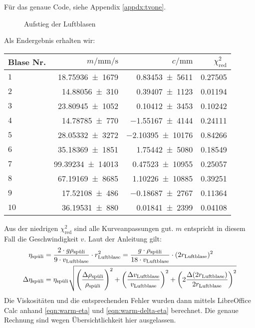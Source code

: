 		Für das genaue \gnuplot{} Code, siehe Appendix \ref{appdx:tvone}. 
		\begin{figure}[H]
			\centering
			\captionsetup{width=0.8\textwidth, justification=centering}
			\resizebox{\linewidth}{!}{}
			\caption{Aufstieg der Luftblasen }
			\vspace{-1em}
		\end{figure}
		Als Endergebnis erhalten wir:
		\begin{center}
			\begin{tabular}{lrrr}
				\toprule
				Blase Nr. & $m/\si{\milli\meter\per\second}$ & $c/\si{\milli\meter}$ & $\chi^2_\text{red}$ \\
				\midrule
					$1$ &  \num{18,75936(1679)} & \num{0,83453(5611)} & \num{0,27505} \\
					$2$ &  \num{14,88056(310)} & \num{0,39407(1123)} & \num{0,01194} \\
					$3$ &  \num{23,80945(1052)} & \num{0,10412(3453)} & \num{0,10242} \\
					$4$ &  \num{14,78785(770)} & \num{-1,55167(4144)} & \num{0,24111} \\
					$5$ &  \num{28,05332(3272)} & \num{-2,10395(10176)} & \num{0,84266} \\
					$6$ &  \num{35,18369(1851)} & \num{1,75442(5080)} & \num{0,18549} \\
					$7$ &  \num{99,39234(14013)} & \num{0,47523(10955)} & \num{0,25057} \\
					$8$ &  \num{67,19169(8685)} & \num{1,10226(10885)} & \num{0,39251} \\
					$9$ &  \num{17,52108(486)} & \num{-0,18687(2767)} & \num{0,11364} \\
					$10$ & \num{36,19531(880)} & \num{0,01841(2399)} & \num{0,04108} \\
				\bottomrule
			\end{tabular}
		\end{center}
		Aus der niedrigen $\chi^2_\text{red}$ sind alle Kurveanpassungen gut. $m$ entspricht in diesem Fall die Geschwindigkeit $v$.
		Laut der Anleitung gilt:
		\begin{align}
			\eta_\spuli &= \frac{2\cdot g\rho_\spuli}{9\cdot v_\text{Luftblase}}\cdot r^2_\text{Luftblase} = \frac{g\cdot \rho_\spuli}{18\cdot v_\text{Luftblase}}\cdot (2r_\text{Luftblase})^2 \label{eqn:warm-eta} \\
			\Delta \eta_\spuli &= \eta_\spuli \sqrt{
				\left(\frac{\Delta \rho_\spuli}{\rho_\spuli}\right)^2 +
				\left(\frac{\Delta v_\text{Luftblase}}{v_\text{Luftblase}}\right)^2 +
				\left(2\frac{\Delta (2r_\text{Luftblase})}{2r_\text{Luftblase}}\right)^2
			} \label{eqn:warm-delta-eta}
		\end{align}
		Die Viskositäten und die entsprechenden Fehler wurden dann mittels LibreOffice Calc anhand \eqref{eqn:warm-eta} und \eqref{eqn:warm-delta-eta} berechnet. Die genaue Rechnung sind wegen Übersichtlichkeit hier ausgelassen.

